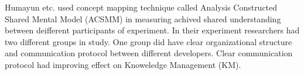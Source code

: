\documentclass[english]{tktltiki2}
\theoremstyle{definition}
\theoremstyle{remark}
\begin{document}
Humayun etc. used concept mapping technique called Analysis Constructed Shared Mental Model (ACSMM) in measuring achived shared understanding between deifferent participants of experiment. In their experiment researchers had two different groups in study. One group did have clear organizational structure and communication protocol between different developers. Clear communication protocol had improving effect on Knoweledge Management (KM)\cite{organizationalStructure}.



%
%
% 
%







%
\end{document}
